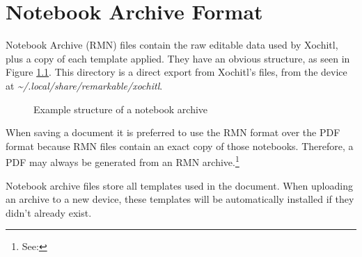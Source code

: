 \chapter{Notebook Archive Format}
\label{sec:notebookarchiveformat}
Notebook Archive (RMN) files contain the raw editable data used by Xochitl, plus a copy of each template applied. They have an obvious structure, as seen in Figure \ref{fig:rmnstructure}. This directory is a direct export from Xochitl's files, from the device at \linebreak \textit{\textasciitilde/.local/share/remarkable/xochitl}.

\begin{figure}[h]
\caption{Example structure of a notebook archive}
\label{fig:rmnstructure}
\end{figure}

When saving a document it is preferred to use the RMN format over the PDF format because RMN files contain an exact copy of those notebooks. Therefore, a PDF may always be generated from an RMN archive.\footnote{See: }

Notebook archive files store all templates used in the document. When uploading an archive to a new device, these templates will be automatically installed if they didn't already exist.
